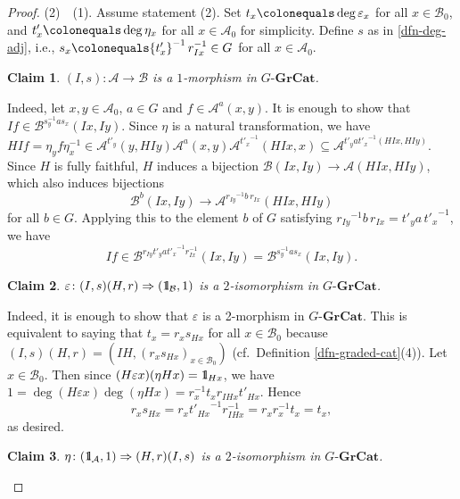 \documentclass{surv-l}
\numberwithin{equation}{chapter}
\numberwithin{figure}{chapter}
\theoremstyle{plain}
\newtheorem{clm}{Claim}
\theoremstyle{definition}
\theoremstyle{remark}
\newcommand{\id}{1\kern-.25em{\text{{\rm l}}}}
\newcommand{\GGrCat}{G\text{-}\mathbf{GrCat}}
\begin{document}
\begin{proof}
(2)\ \text{$\Rightarrow$}\  (1).
Assume statement (2).
Set $t_x\colonequals  \deg \varepsilon_x$ for all $x \in \mathcal{B}_0$, and $t'_x\colonequals  \deg \eta_x$ for all $x \in \mathcal{A}_0$ for simplicity.
Define $s$ as in \eqref{dfn-deg-adj}, i.e.,
$s_x\colonequals  {t'_x}^{-1}\,r_{Ix}^{-1} \in G$
for all $x \in \mathcal{A}_0$.
\setcounter{clm}{0}
\begin{clm}
$(I, s) \colon \mathcal{A} \to \mathcal{B}$ is a $1$-morphism in $\GGrCat$.
\end{clm}
Indeed,
let $x, y \in \mathcal{A}_0$, $a \in G$ and $f \in \mathcal{A}^a(x, y)$.
It is enough to show that $If \in \mathcal{B}^{s_y^{-1} a s_x}(Ix, Iy)$.
Since $\eta$ is a natural transformation,
we have $HIf = \eta_y f \eta_x^{-1} \in \mathcal{A}^{t'_y}(y, HIy)
\mathcal{A}^a(x, y) \mathcal{A}^{{t'_x}^{-1}}(HIx, x) \subseteq \mathcal{A}^{t'_y a {t'_x}^{-1}(HIx, HIy)}$.
Since $H$ is fully faithful, $H$ induces a bijection $\mathcal{B}(Ix, Iy) \to \mathcal{A}(HIx, HIy)$,
which also induces bijections
\begin{equation*}
\mathcal{B}^b(Ix, Iy) \to \mathcal{A}^{{r_{Iy}}^{-1} b\, r_{Ix}}(HIx, HIy)
\end{equation*}
for all $b \in G$.
Applying this to the element $b$ of $G$ satisfying ${r_{Iy}}^{-1} b\, r_{Ix} = t'_y a\, {t'_x}^{-1}$, we have
\begin{equation*}
If \in \mathcal{B}^{r_{Iy} t'_y a {t'_x}^{-1} r_{Ix}^{-1}}(Ix, Iy) = \mathcal{B}^{s_y^{-1} a s_x}(Ix, Iy).
\end{equation*}

\begin{clm}
$\varepsilon \colon (I, s)(H, r) \Rightarrow (\id_{\mathcal{B}}, 1)$ is a $2$-isomorphism in $\GGrCat$.
\end{clm}

Indeed,
it is enough to show that $\varepsilon$ is a 2-morphism in $\GGrCat$.
This is equivalent to saying that $t_x = r_x s_{Hx}$ for all $x \in \mathcal{B}_0$
because $(I, s)(H, r) = (IH, (r_x s_{Hx})_{x \in \mathcal{B}_0})$
(cf.\ Definition \ref{dfn-graded-cat}(4)).
Let $x \in \mathcal{B}_0$.  Then since $(H\varepsilon x) (\eta Hx) = \id_{Hx}$,
we have $1 = \deg(H\varepsilon x)\deg(\eta Hx) = r_x^{-1} t_x r_{IHx} t'_{Hx}$.
Hence
\[
r_x s_{Hx} = r_x {t'_{Hx}}^{-1} r_{IHx}^{-1} =r_x r_x^{-1} t_x = t_x,
\]
as desired.

\begin{clm}
$\eta \colon (\id_{\mathcal{A}}, 1) \Rightarrow (H, r)(I, s)$ is a $2$-isomorphism in $\GGrCat$.
\end{clm}


\end{proof}
\end{document}
